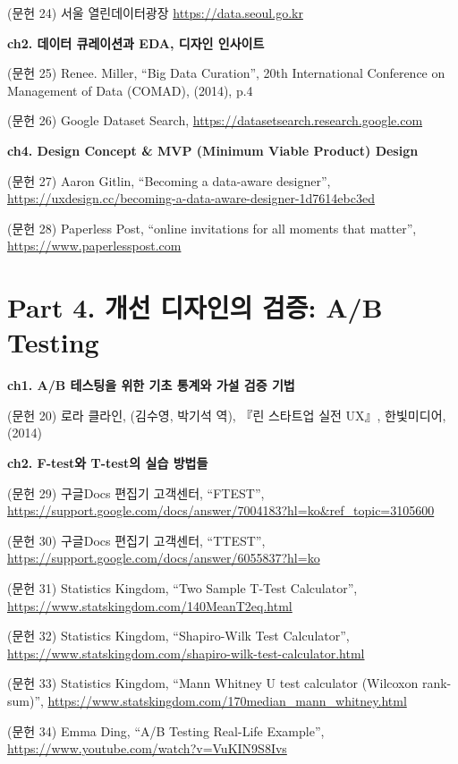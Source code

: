 \documentclass[
  letterpaper,
]{book}
\begin{document}
(문헌 24) 서울 열린데이터광장 \url{https://data.seoul.go.kr}

\textbf{ch2. 데이터 큐레이션과 EDA, 디자인 인사이트}

(문헌 25) Renee. Miller, ``Big Data Curation'', 20th International
Conference on Management of Data (COMAD), (2014), p.4

(문헌 26) Google Dataset Search,
\url{https://datasetsearch.research.google.com}

\textbf{ch4. Design Concept \& MVP (Minimum Viable Product) Design}

(문헌 27) Aaron Gitlin, ``Becoming a data-aware designer'',
\url{https://uxdesign.cc/becoming-a-data-aware-designer-1d7614ebc3ed}

(문헌 28) Paperless Post, ``online invitations for all moments that
matter'', \url{https://www.paperlesspost.com}

\section*{Part 4. 개선 디자인의 검증: A/B
Testing}\label{part-4.-uxac1cuxc120-uxb514uxc790uxc778uxc758-uxac80uxc99d-ab-testing-2}


\textbf{ch1. A/B 테스팅을 위한 기초 통계와 가설 검증 기법}

(문헌 20) 로라 클라인, (김수영, 박기석 역), 『린 스타트업 실전 UX』,
한빛미디어,(2014)

\textbf{ch2. F-test와 T-test의 실습 방법들}

(문헌 29) 구글Docs 편집기 고객센터, ``FTEST'',
\url{https://support.google.com/docs/answer/7004183?hl=ko&ref_topic=3105600}

(문헌 30) 구글Docs 편집기 고객센터, ``TTEST'',
\url{https://support.google.com/docs/answer/6055837?hl=ko}

(문헌 31) Statistics Kingdom, ``Two Sample T-Test Calculator'',
\url{https://www.statskingdom.com/140MeanT2eq.html}

(문헌 32) Statistics Kingdom, ``Shapiro-Wilk Test Calculator'',
\url{https://www.statskingdom.com/shapiro-wilk-test-calculator.html}

(문헌 33) Statistics Kingdom, ``Mann Whitney U test calculator (Wilcoxon
rank-sum)'',
\url{https://www.statskingdom.com/170median_mann_whitney.html}

(문헌 34) Emma Ding, ``A/B Testing Real-Life Example'',
\url{https://www.youtube.com/watch?v=VuKIN9S8Ivs}


\backmatter
\printbibliography


\printindex
\end{document}
